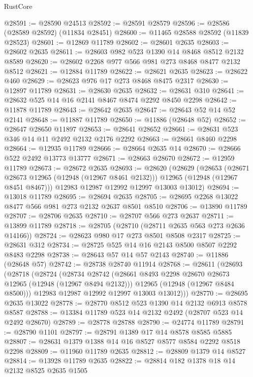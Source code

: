 \begin{lexlean}{RustCore}
\begin{coremodule}
@28591 := @28590 @24513
@28592 := @28591 @28579
@28596 := @28586 (@28589 @28592) (@11834 @28451)
@28600 := @11465 @28588 @28592 (@11839 @28523)
@28601 := @12869 @11789
@28602 := @28601 @2635
@28603 := @28602 @2635
@28611 := @28603 @982 @523 @1390 @14 @8468 @8512 @2132 @8589
@28620 := @28602 @2268 @977 @566 @981 @273 @8468 @8477 @2132 @8512
@28621 := @12884 @11789
@28622 := @28621 @2635
@28623 := @28622 @460
@28629 := @28623 @976 @17 @273 @8468 @8475 @2317
@28630 := @12897 @11789
@28631 := @28630 @2635
@28632 := @28631 @310
@28641 := @28632 @525 @14 @16 @2141 @8467 @8474 @2292 @8450 @2298
@28642 := @11878 @11789
@28643 := @28642 @2635
@28647 := @28643 @52 @14 @52 @2141
@28648 := @11887 @11789
@28650 := @11886 (@28648 @52)
@28652 := @28647 @28650 @11897
@28653 := @28641 @28652
@28661 := @28631 @523 @346 @14 @11 @2492 @2132 @2176 @2292
@28663 := @28661 @8460 @2298
@28664 := @12935 @11789
@28666 := @28664 @2635 @14
@28670 := @28666 @522 @2492 @13773 @13777
@28671 := @28663 @28670
@28672 := @12959 @11789
@28673 := @28672 @2635
@28693 := @28620
    (@28629
      (@28653
        (@28671 @28673 @12965 (@12948 (@12967 @8461 @2132)))
        @12965
        (@12948 (@12967 @8451 @8467)))
      @12983
      @12987
      @12992
      @12997
      @13003
      @13012)
@28694 := @13018 @11789
@28695 := @28694 @2635
@28705 := @28695 @2268 @13022 @8477 @566 @981 @273 @2132 @2637 @8501 @8510
@28706 := @13890 @11789
@28707 := @28706 @2635
@28710 := @28707 @566 @273 @2637
@28711 := @13899 @11789
@28718 := @28705 (@28710 (@28711 @2635 @563 @273 @2636 @14166))
@28724 := @28623 @980 @17 @273 @8501 @8508 @2317
@28725 := @28631 @312
@28734 := @28725 @525 @14 @16 @2143 @8500 @8507 @2292 @8483 @2298
@28738 := @28643 @57 @14 @57 @2143
@28740 := @11886 (@28648 @57)
@28742 := @28738 @28740 @11914
@28768 := @28611
    (@28693
      (@28718
        (@28724
          (@28734
            @28742
            (@28661 @8493 @2298 @28670 @28673 @12965 (@12948 (@12967 @8494 @2132)))
            @12965
            (@12948 (@12967 @8484 @8500)))
          @12983
          @12987
          @12992
          @12997
          @13003
          @13012)))
@28770 := @28695 @2635 @13022
@28778 := @28770 @8512 @523 @1390 @14 @2132 @6913 @8578 @8587
@28788 := @13384 @11789 @523 @14 @2132 @2492 (@28707 @523 @14 @2492 @28670)
@28789 := @28778 @28788
@28790 := @24774 @11789
@28791 := @28790 @1101
@28797 := @28791 @1389 @17 @14 @8578 @8585 @5885
@28807 := @28631 @1379 @1388 @14 @16 @8527 @8577 @8584 @2292 @8518 @2298
@28809 := @11960 @11789 @2635
@28812 := @28809 @1379 @14 @8527
@28814 := @13928 @11789 @2635
@28822 := @28814 @182 @1378 @18 @14 @2132 @8525 @2635 @1505

\end{coremodule}
\end{lexlean}
